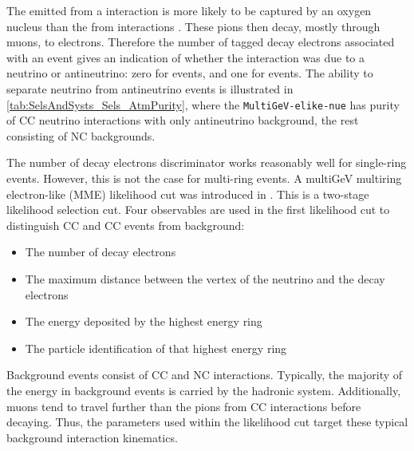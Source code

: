The \quickmath{\pi^{-}} emitted from a  interaction is more likely to be captured by an oxygen nucleus than the \quickmath{\pi^{+}} from  interactions \cite{LeeKaPik}. These pions then decay, mostly through muons, to electrons. Therefore the number of tagged decay electrons associated with an event gives an indication of whether the interaction was due to a neutrino or antineutrino: zero for  events, and one for  events. The ability to separate neutrino from antineutrino events is illustrated in \autoref{tab:SelsAndSysts_Sels_AtmPurity}, where the \texttt{MultiGeV-elike-nue} has  purity of CC neutrino interactions with only  antineutrino background, the rest consisting of NC backgrounds.

The number of decay electrons discriminator works reasonably well for single-ring events. However, this is not the case for multi-ring events. A multiGeV multiring electron-like (MME) likelihood cut was introduced in \cite{PhysRevD.81.092004, PhysRevD.74.032002}. This is a two-stage likelihood selection cut. Four observables are used in the first likelihood cut to distinguish CC and CC events from background:

\begin{itemize}
\item The number of decay electrons
\item The maximum distance between the vertex of the neutrino and the decay electrons
\item The energy deposited by the highest energy ring
\item The particle identification of that highest energy ring
\end{itemize}

Background events consist of CC\quickmath{\nu_{\mu}} and NC interactions. Typically, the majority of the energy in background events is carried by the hadronic system. Additionally, muons tend to travel further than the pions from CC interactions before decaying. Thus, the parameters used within the likelihood cut target these typical background interaction kinematics.

